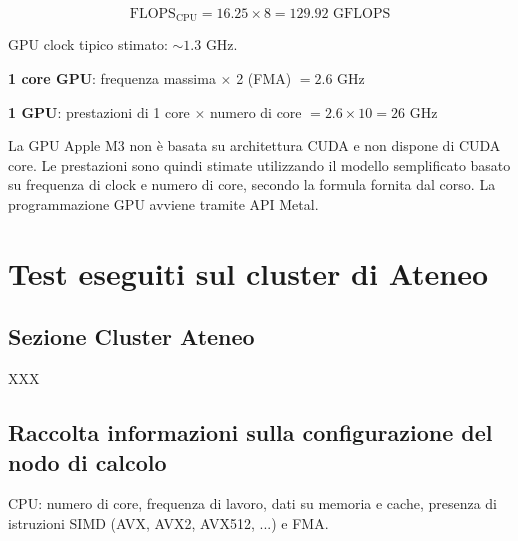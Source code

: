 \documentclass[11pt,a4paper]{article}
\begin{document}
\begin{equation}
\text{FLOPS}_{\text{CPU}} = 16.25 \times 8 = 129.92 \text{ GFLOPS}
\end{equation}

GPU clock tipico stimato: $\sim 1.3$ GHz.

\textbf{1 core GPU}: frequenza massima $\times$ 2 (FMA) $= 2.6$ GHz

\textbf{1 GPU}: prestazioni di 1 core $\times$ numero di core $= 2.6 \times 10 = 26$ GHz

La GPU Apple M3 non è basata su architettura CUDA e non dispone di CUDA core. Le prestazioni sono quindi stimate utilizzando il modello semplificato basato su frequenza di clock e numero di core, secondo la formula fornita dal corso. La programmazione GPU avviene tramite API Metal.

\section{Test eseguiti sul cluster di Ateneo}

\subsection{Sezione Cluster Ateneo}

XXX

\subsection{Raccolta informazioni sulla configurazione del nodo di calcolo}

CPU: numero di core, frequenza di lavoro, dati su memoria e cache, presenza di istruzioni SIMD (AVX, AVX2, AVX512, ...) e FMA.
\end{document}
